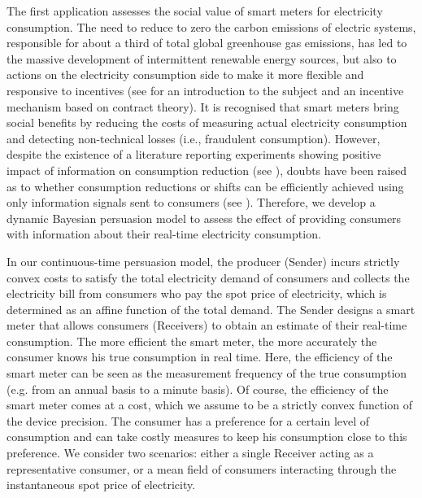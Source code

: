 \documentclass[a4paper,10pt]{article}
\theoremstyle{definition}
\theoremstyle{plain}
\numberwithin{equation}{section}
\begin{document}
\medskip

The first application assesses the social value of smart meters for electricity consumption. The need to reduce to zero the carbon emissions of electric systems, responsible for about a third of total global greenhouse gas emissions, has led to the massive development of intermittent renewable energy sources, but also to actions on the electricity consumption side to make it more flexible and responsive to incentives (see \cite{Aid22} for an introduction to the subject and an incentive mechanism based on contract theory). It is recognised that smart meters bring social benefits by reducing the costs of measuring actual electricity consumption and detecting non-technical losses (i.e., fraudulent consumption). However, despite the existence of a literature reporting experiments showing positive impact of information on consumption reduction (see \cite{Karlin15}), doubts have been raised as to whether consumption reductions or shifts can be efficiently achieved using only information signals sent to consumers (see \cite{Pepermans14, Dato20}). Therefore, we develop a dynamic Bayesian persuasion model to assess the effect of providing consumers with information about their real-time electricity consumption. 

In our continuous-time persuasion model, the producer (Sender) incurs strictly convex costs to satisfy the total electricity demand of consumers and collects the electricity bill from consumers who pay the spot price of electricity, which is determined as an affine function of the total demand. The Sender designs a smart meter that allows consumers (Receivers) to obtain an estimate of their real-time consumption. The more efficient the smart meter, the more accurately the consumer knows his true consumption in real time. Here, the efficiency of the smart meter can be seen as the measurement frequency of the true consumption (e.g. from an annual basis to a minute basis). Of course, the efficiency of the smart meter comes at a cost, which we assume to be a strictly convex function of the device precision. The consumer has a preference for a certain level of consumption and can take costly measures to keep his consumption close to this preference. We consider two scenarios: either a single Receiver acting as a representative consumer, or a mean field of consumers interacting through the instantaneous spot price of electricity.
\end{document}
